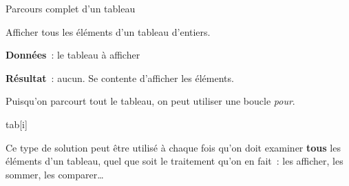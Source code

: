 \begin{Fiche}{Parcours complet d’un tableau}
\label{fiche:tab-parcours-complet}

	Afficher tous les éléments d’un tableau d’entiers.

	
	\textbf{Données}~: le tableau à afficher
		
	\textbf{Résultat}~: aucun. Se contente d’afficher les éléments.


	Puisqu’on parcourt tout le tableau,
	on peut utiliser une boucle \emph{pour}.
	
	\begin{LDA}
				\Write tab[i]
			\EndFor
		\EndAlgo
	\end{LDA}


	Ce type de solution peut être utilisé à chaque fois
	qu’on doit examiner \textbf{tous} les éléments d’un tableau,
	quel que soit le traitement qu’on en fait~:
	les afficher, les sommer, les comparer\dots
	
	
\end{Fiche}

